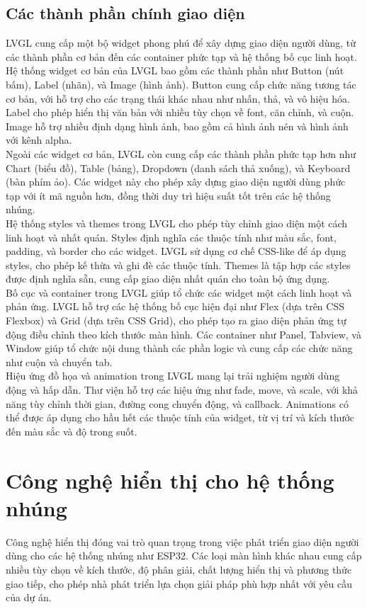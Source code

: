 \subsection{Các thành phần chính giao diện}
\tab LVGL cung cấp một bộ widget phong phú để xây dựng giao diện người dùng, từ các thành phần cơ bản đến các container phức tạp và hệ thống bố cục linh hoạt.\\
Hệ thống widget cơ bản của LVGL bao gồm các thành phần như Button (nút bấm), Label (nhãn), và Image (hình ảnh). Button cung cấp chức năng tương tác cơ bản, với hỗ trợ cho các trạng thái khác nhau như nhấn, thả, và vô hiệu hóa. Label cho phép hiển thị văn bản với nhiều tùy chọn về font, căn chỉnh, và cuộn. Image hỗ trợ nhiều định dạng hình ảnh, bao gồm cả hình ảnh nén và hình ảnh với kênh alpha.\\
\tab Ngoài các widget cơ bản, LVGL còn cung cấp các thành phần phức tạp hơn như Chart (biểu đồ), Table (bảng), Dropdown (danh sách thả xuống), và Keyboard (bàn phím ảo). Các widget này cho phép xây dựng giao diện người dùng phức tạp với ít mã nguồn hơn, đồng thời duy trì hiệu suất tốt trên các hệ thống nhúng.\\
\tab Hệ thống styles và themes trong LVGL cho phép tùy chỉnh giao diện một cách linh hoạt và nhất quán. Styles định nghĩa các thuộc tính như màu sắc, font, padding, và border cho các widget. LVGL sử dụng cơ chế CSS-like để áp dụng styles, cho phép kế thừa và ghi đè các thuộc tính. Themes là tập hợp các styles được định nghĩa sẵn, cung cấp giao diện nhất quán cho toàn bộ ứng dụng.\\
\tab Bố cục và container trong LVGL giúp tổ chức các widget một cách linh hoạt và phản ứng. LVGL hỗ trợ các hệ thống bố cục hiện đại như Flex (dựa trên CSS Flexbox) và Grid (dựa trên CSS Grid), cho phép tạo ra giao diện phản ứng tự động điều chỉnh theo kích thước màn hình. Các container như Panel, Tabview, và Window giúp tổ chức nội dung thành các phần logic và cung cấp các chức năng như cuộn và chuyển tab.\\
\tab Hiệu ứng đồ họa và animation trong LVGL mang lại trải nghiệm người dùng động và hấp dẫn. Thư viện hỗ trợ các hiệu ứng như fade, move, và scale, với khả năng tùy chỉnh thời gian, đường cong chuyển động, và callback. Animations có thể được áp dụng cho hầu hết các thuộc tính của widget, từ vị trí và kích thước đến màu sắc và độ trong suốt.
\section{Công nghệ hiển thị cho hệ thống nhúng}
\tab Công nghệ hiển thị đóng vai trò quan trọng trong việc phát triển giao diện người dùng cho các hệ thống nhúng như ESP32. Các loại màn hình khác nhau cung cấp nhiều tùy chọn về kích thước, độ phân giải, chất lượng hiển thị và phương thức giao tiếp, cho phép nhà phát triển lựa chọn giải pháp phù hợp nhất với yêu cầu của dự án.
